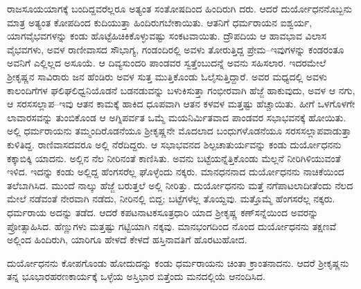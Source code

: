 ರಾಜಸೂಯಯಾಗಕ್ಕೆ ಬಂದಿದ್ದವರೆಲ್ಲರೂ ಅತ್ಯಂತ ಸಂತೋಷದಿಂದ ಹಿಂದಿರುಗಿ ದರು. ಆದರೆ ದುರ್ಯೋಧನನೊಬ್ಬನು ಮಾತ್ರ ಅತ್ಯಂತ ಕೋಪದಿಂದ ಕುದಿಯುತ್ತಾ ಹಿಂದಿರುಗಬೇಕಾಯಿತು. ಆತನಿಗೆ ಧರ್ಮರಾಯನ ಐಶ್ವರ್ಯ, ಯಾಗವೈಭವಗಳನ್ನು ಕಂಡು ಹೊಟ್ಟೆಹಿಚಿಕಿಕೊಳ್ಳುವಷ್ಟು ಸಂಕಟವಾಯಿತು. ದ್ರೌಪದಿಯ ಆ ಹಾವಭಾವ ವಿಲಾಸ ವೈಭವಗಳು, ಅವಳ ರಾಣೀವಾಸದ ಸೌಭಾಗ್ಯ, ಗಂಡಂದಿರಲ್ಲಿ ಅವಳು ತೋರುತ್ತಿದ್ದ ಪ್ರೇಮ–ಇವುಗಳನ್ನು ಕಂಡರಂತೂ ಅವನಿಗೆ ಎಲ್ಲಿಲ್ಲದ ಅಸೂಯೆ. ಆ ದಿವ್ಯಸುಂದರಿ ಪಾಂಡವರ ಸ್ವತ್ತೆಂಬುದನ್ನೆ ಅವನು ಸಹಿಸಲಾರ. ಇದರಮೇಲೆ ಶ್ರೀಕೃಷ್ಣನ ಸಾವಿರಾರು ಜನ ಹೆಂಡಿರು ಅವಳ ಸುತ್ತ ಮುತ್ತಿಕೊಂಡು ಓಲೈಸುತ್ತಿದ್ದಾರೆ. ಅವರ ಮಧ್ಯದಲ್ಲಿ ಅವಳು ಕಾಲಂದಿಗೆಗಳ ಘಲಿಘಲಿಧ್ವನಿಯೊಡನೆ ಬಡನಡುವನ್ನು ಬಳುಕಿಸುತ್ತಾ ಗಂಭೀರವಾಗಿ ಹೆಜ್ಜೆ ಹಾಕುವುದು, ಅವಳ ಆ ನಗು, ಆ ಸರಸಸಲ್ಲಾಪ–ಇವು ಆತನ ಕಾಮಕ್ಕೆ ಹಾಕಿದ ಧೂಪವಾಗಿ ಆತನ ಕಳವಳ ಮತ್ತಷ್ಟು ಹೆಚ್ಚಾಯಿತು. ಹೀಗೆ ಒಳಗೊಳಗೇ ಲಾವಾರಸವನ್ನು ತುಂಬಿಕೊಂಡ ಆ ಅಗ್ನಿಪರ್ವತ ಒಮ್ಮೆ ಮಯನಿರ್ಮಿತವಾದ ಪಾಂಡವರ ಸಭಾಭವನಕ್ಕೆ ಹೋಯಿತು. ಅಲ್ಲಿ ಧರ್ಮರಾಯನು ತಮ್ಮಂದಿರೊಡನೆಯೂ ಶ್ರೀಕೃಷ್ಣನೇ ಮೊದಲಾದ ಬಂಧುಗಳೊಡನೆಯೂ ಸರಸಸಲ್ಲಾಪವಾಡುತ್ತಾ ಕುಳಿತಿದ್ದ. ರಾಣಿವಾಸದವರೂ ಅಲ್ಲಿ ನೆರೆದಿದ್ದರು. ಆ ಸಭಾಭವನದ ಶಿಲ್ಪಚಾತುರ್ಯವನ್ನು ಕಂಡು ದುರ್ಯೋಧನನು ಕಕ್ಕಾಬಿಕ್ಕಿ ಯಾದನು. ಅಲ್ಲಿನ ನೆಲ ನೀರಿನಂತೆ ಕಾಣಿಸಿತು. ಅವನು ಬಟ್ಟೆಯನ್ನೆತ್ತಿಕೊಂಡು ಮೆಲ್ಲನೆ ನೀರಿಗಿಳಿಯುವಂತೆ ಇಳಿದ. ಇದನ್ನು ಕಂಡು ಅಲ್ಲಿದ್ದ ಹೆಂಗಸರೆಲ್ಲ ಘೊಳ್ಳೆಂದು ನಕ್ಕರು. ಮಾನಧನನಾದ ದುರ್ಯೋಧನನು ನಾಚಿಕೆಯಿಂದ ತಲೆಬಾಗಿಸಿದ. ಮುಂದೆ ನಾಲ್ಕು ಹೆಜ್ಜೆ ಬರುತ್ತಲೆ ಅಲ್ಲಿ ನೀರಿತ್ತು. ದುರ್ಯೋಧನನು ಮತ್ತೆ ನಗೆಪಾಟಲಾದೀತೆಂದು ನೆಲದ ಮೇಲೆ ನಡೆವಂತೆ ನೇರವಾಗಿ ನಡೆದು, ನೀರಿನಲ್ಲಿ ಬಿದ್ದ; ಬಟ್ಟೆಗಳೆಲ್ಲ ತೊಯ್ದವು. ಮತ್ತೊಮ್ಮೆ ಹೆಂಗಸರೆಲ್ಲ ನಕ್ಕರು. ಧರ್ಮರಾಯ ಅದನ್ನು ತಡೆದ. ಆದರೆ ಕಪಟನಾಟಕಸೂತ್ರಧಾರಿ ಯಾದ ಶ್ರೀಕೃಷ್ಣ ಕಣ್​ಸನ್ನೆಯಿಂದ ಅವರನ್ನು ಪ್ರೋತ್ಸಾಹಿಸಿದ. ಹೆಣ್ಣುಗಳು ಮತ್ತಷ್ಟು ಗಟ್ಟಿಯಾಗಿ ನಕ್ಕವು. ಮಾನಭಂಗದಿಂದ ನೊಂದ ದುರ್ಯೋಧನನು ತಕ್ಷಣವೆ ಅಲ್ಲಿಂದ ಹಿಂದಿರುಗಿ, ಯಾರಿಗೂ ಹೇಳದೆ ಕೇಳದೆ ಹಸ್ತಿನಾವತಿಗೆ ಹೊರಟುಹೋದ.

ದುರ್ಯೋಧನನು ಕೋಪಗೊಂಡು ಹೋದುದನ್ನು ಕಂಡು ಧರ್ಮರಾಯನು ಚಿಂತಾ ಕ್ರಾಂತನಾದನು. ಆದರೆ ಶ್ರೀಕೃಷ್ಣನು ತನ್ನ ಭೂಭಾರಹರಣಕಾರ್ಯಕ್ಕೆ ಒಳ್ಳೆಯ ಅಸ್ತಿಭಾರ ಬಿತ್ತೆಂದು ಮನದಲ್ಲಿಯೆ ಆನಂದಿಸಿದ.

